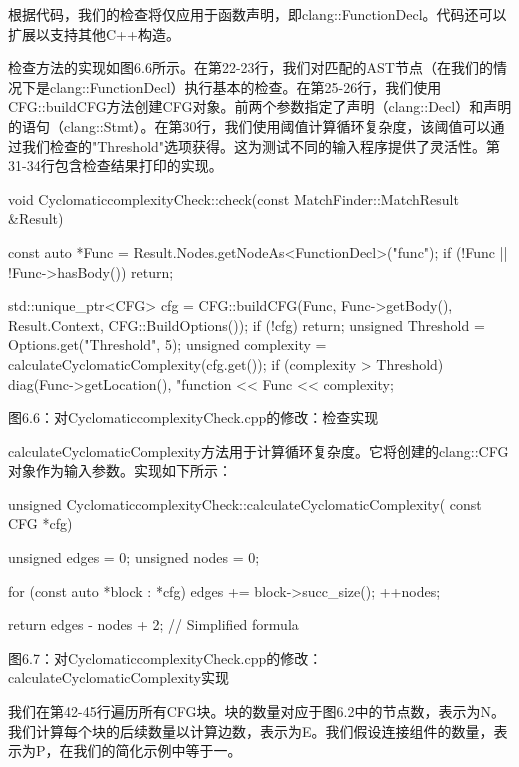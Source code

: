 根据代码，我们的检查将仅应用于函数声明，即clang::FunctionDecl。代码还可以扩展以支持其他C++构造。

检查方法的实现如图6.6所示。在第22-23行，我们对匹配的AST节点（在我们的情况下是clang::FunctionDecl）执行基本的检查。在第25-26行，我们使用CFG::buildCFG方法创建CFG对象。前两个参数指定了声明（clang::Decl）和声明的语句（clang::Stmt）。在第30行，我们使用阈值计算循环复杂度，该阈值可以通过我们检查的"Threshold"选项获得。这为测试不同的输入程序提供了灵活性。第31-34行包含检查结果打印的实现。

\begin{cpp}
void CyclomaticcomplexityCheck::check(const MatchFinder::MatchResult &Result) {
  const auto *Func = Result.Nodes.getNodeAs<FunctionDecl>("func");
  if (!Func || !Func->hasBody()) return;

  std::unique_ptr<CFG> cfg =
    CFG::buildCFG(Func, Func->getBody(), Result.Context, CFG::BuildOptions());
  if (!cfg) return;
  unsigned Threshold = Options.get("Threshold", 5);
  unsigned complexity = calculateCyclomaticComplexity(cfg.get());
  if (complexity > Threshold) {
    diag(Func->getLocation(), "function %
      << Func << complexity;
  }
}
\end{cpp}

\begin{center}
图6.6：对CyclomaticcomplexityCheck.cpp的修改：检查实现
\end{center}

calculateCyclomaticComplexity方法用于计算循环复杂度。它将创建的clang::CFG对象作为输入参数。实现如下所示：

\begin{cpp}
unsigned CyclomaticcomplexityCheck::calculateCyclomaticComplexity(
    const CFG *cfg) {
  unsigned edges = 0;
  unsigned nodes = 0;

  for (const auto *block : *cfg) {
    edges += block->succ_size();
    ++nodes;
  }

  return edges - nodes + 2;  // Simplified formula
}
\end{cpp}

\begin{center}
 图6.7：对CyclomaticcomplexityCheck.cpp的修改：calculateCyclomaticComplexity实现
\end{center}

我们在第42-45行遍历所有CFG块。块的数量对应于图6.2中的节点数，表示为N。我们计算每个块的后续数量以计算边数，表示为E。我们假设连接组件的数量，表示为P，在我们的简化示例中等于一。

